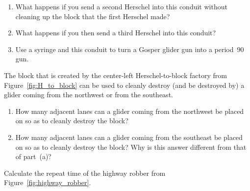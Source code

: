 \begin{multicols}{2}
\begin{problem}
	\begin{enumerate}[label=\bf\color{ocre}(\alph*)]
		\item What happens if you send a second Herschel into this conduit without cleaning up the block that the first Herschel made?
		
		\item What happens if you then send a third Herschel into this conduit?
		
		\item Use a syringe and this conduit to turn a Gosper glider gun into a period~$90$ gun.
	\end{enumerate}
\end{problem}


\mfilbreak


\begin{problem}\label{exer:block_factory_block_gliders}
	The block that is created by the center-left Herschel-to-block factory from Figure~\ref{fig:H_to_block} can be used to cleanly destroy (and be destroyed by) a glider coming from the northwest or from the southeast.
	
	\begin{enumerate}[label=\bf\color{ocre}(\alph*)]
		\item How many adjacent lanes can a glider coming from the northwest be placed on so as to cleanly destroy the block?
		
		\item How many adjacent lanes can a glider coming from the southeast be placed on so as to cleanly destroy the block? Why is this answer different from that of part~(a)?
	\end{enumerate}
\end{problem}


\mfilbreak


\begin{problem}\label{exer:highway_robber_repeat}
	Calculate the repeat time of the highway robber from Figure~\ref{fig:highway_robber}.
\end{problem}




\end{multicols}
\normalsize\vspace*{0.01cm}
